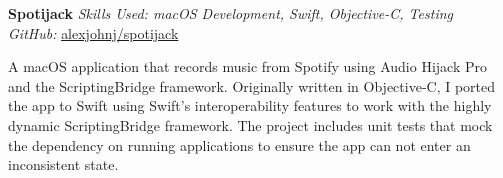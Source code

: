 \textbf{Spotijack}  \newline
\textit{Skills Used: macOS Development, Swift, Objective-C, Testing}\\
\textit{GitHub:} \href{https://github.com/\myweb/spotijack}{alexjohnj/spotijack}

A macOS application that records music from Spotify using Audio Hijack Pro and
the ScriptingBridge framework. Originally written in Objective-C, I ported the
app to Swift using Swift's interoperability features to work with the highly
dynamic ScriptingBridge framework. The project includes unit tests that mock the
dependency on running applications to ensure the app can not enter an
inconsistent state.

